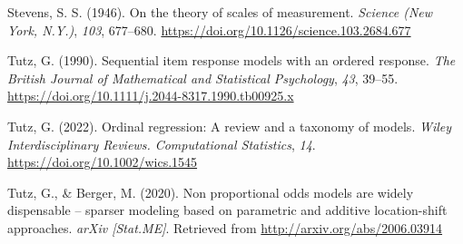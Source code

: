 \documentclass[
  man, mask,floatsintext]{apa6}
\newlength{\cslhangindent}
\newenvironment{CSLReferences}[2] %
 {\begin{list}{}{%
  \setlength{\itemindent}{0pt}
  \setlength{\leftmargin}{0pt}
  \setlength{\parsep}{0pt}
  \ifodd #1
   \setlength{\leftmargin}{\cslhangindent}
   \setlength{\itemindent}{-1\cslhangindent}
  \fi
  \setlength{\itemsep}{#2\baselineskip}}}
 {\end{list}}
\begin{document}
\begin{CSLReferences}{1}{0}
Stevens, S. S. (1946). On the theory of scales of measurement. \emph{Science (New York, N.Y.)}, \emph{103}, 677--680. \url{https://doi.org/10.1126/science.103.2684.677}

Tutz, G. (1990). Sequential item response models with an ordered response. \emph{The British Journal of Mathematical and Statistical Psychology}, \emph{43}, 39--55. \url{https://doi.org/10.1111/j.2044-8317.1990.tb00925.x}

Tutz, G. (2022). Ordinal regression: A review and a taxonomy of models. \emph{Wiley Interdisciplinary Reviews. Computational Statistics}, \emph{14}. \url{https://doi.org/10.1002/wics.1545}

Tutz, G., \& Berger, M. (2020). Non proportional odds models are widely dispensable -- sparser modeling based on parametric and additive location-shift approaches. \emph{arXiv {[}Stat.ME{]}}. Retrieved from \url{http://arxiv.org/abs/2006.03914}

\end{CSLReferences}
\end{document}
